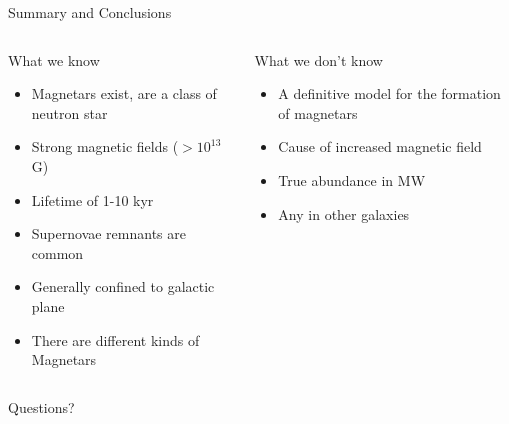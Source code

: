 \documentclass[hyperref=pdftex, presentation]{beamer}
\begin{document}
\begin{frame}{Summary and Conclusions}

  \begin{columns}[c] %

			\begin{block}{What we know}
				\begin{itemize}
 					\item Magnetars exist, are a class of neutron star
 					\item Strong magnetic fields ($>10^{13}$ G)
 					\item Lifetime of 1-10 kyr
 					\item Supernovae remnants are common
 					\item Generally confined to galactic plane
 					\item There are different kinds of Magnetars
				\end{itemize}
			\end{block}
			\begin{block}{What we don't know}
				\begin{itemize}
 					\item A definitive model for the formation of magnetars %
 					\item Cause of increased magnetic field
 					\item True abundance in MW
 					\item Any in other galaxies
				\end{itemize}
			\end{block}

		\end{columns}
\end{frame}


\begin{frame}{Questions?}
	
\end{frame}
\end{document}
